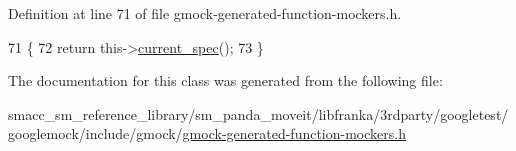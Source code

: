Definition at line 71 of file gmock-\/generated-\/function-\/mockers.\+h.


\begin{DoxyCode}
71                       \{
72     \textcolor{keywordflow}{return} this->\hyperlink{classtesting_1_1internal_1_1FunctionMockerBase_a744318106e20b346f4f1efbf5a601644}{current\_spec}();
73   \}
\end{DoxyCode}


The documentation for this class was generated from the following file\+:\begin{DoxyCompactItemize}
\item 
smacc\+\_\+sm\+\_\+reference\+\_\+library/sm\+\_\+panda\+\_\+moveit/libfranka/3rdparty/googletest/googlemock/include/gmock/\hyperlink{gmock-generated-function-mockers_8h}{gmock-\/generated-\/function-\/mockers.\+h}\end{DoxyCompactItemize}
